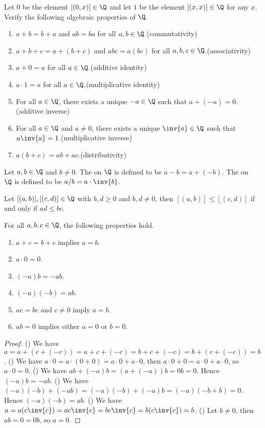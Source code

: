 \documentclass[10pt]{article}
\begin{document}
\begin{problem}
    Let $0$ be the element $[(0,x)]\in\Q$ and let $1$ be the element $[(x,x)]\in\Q$ for any $x$. Verify the following algebraic properties of $\Q$.
    \begin{enumerate}
        \item $a+b=b+a$ and $ab=ba$ for all $a,b\in\Q$.\hfill(commutativity)
        \item $a+b+c=a+(b+c)$ and $abc=a(bc)$ for all $a,b,c\in\Q$.\hfill(associativity)
        \item $a+0=a$ for all $a\in\Q$.\hfill(additive identity)
        \item $a\cdot 1=a$ for all $a\in\Q$.\hfill(multiplicative identity)
        \item For all $a\in\Q$, there exists a unique $-a\in\Q$ such that $a+(-a)=0$.\hfill(additive inverse)
        \item For all $a\in\Q$ and $a\ne 0$, there exists a unique $\inv{a}\in\Q$ such that $a\inv{a}=1$.\hfill(multiplicative inverse)
        \item $a(b+c)=ab+ac$.\hfill(distributivity) 
    \end{enumerate}
\end{problem}
\begin{definition}
    Let $a,b\in\Q$ and $b\ne 0$. The  on $\Q$ is defined to be $a-b=a+(-b)$. The  on $\Q$ is defined to be $a/b=a\cdot\inv{b}$.
\end{definition}
\par
Let $[(a,b)],[(c,d)]\in\Q$ with $b,d\ge 0$ and $b,d\ne 0$, then $[(a,b)]\le[(c,d)]$ if and only if $ad\le bc$.
\begin{proposition}
    For all $a,b,c\in\Q$, the following properties hold.
    \begin{enumerate}
        \item $a+c=b+c$ implies $a=b$.
        \item $a\cdot 0=0$.
        \item $(-a)b=-ab$.
        \item $(-a)(-b)=ab$.
        \item $ac=bc$ and $c\ne 0$ imply $a=b$.
        \item $ab=0$ implies either $a=0$ or $b=0$.
    \end{enumerate}
\end{proposition}
\begin{proof}
    () We have $a=a+(c+(-c))=a+c+(-c)=b+c+(-c)=b+(c+(-c))=b$. () We have $a\cdot 0=a\cdot(0+0)=a\cdot 0+a\cdot 0$, then $a\cdot 0+0=a\cdot 0+a\cdot 0$, so $a\cdot 0=0$. () We have $ab+(-a)b=(a+(-a))b=0b=0$. Hence $(-a)b=-ab$. () We have $(-a)(-b)+(-ab)=(-a)(-b)+(-a)b=(-a)(-b+b)=0$. Hence $(-a)(-b)=ab$. () We have $a=a(c\inv{c})=ac\inv{c}=bc\inv{c}=b(c\inv{c})=b$. () Let $b\ne 0$, then $ab=0=0b$, so $a=0$. 
\end{proof}
\end{document}
